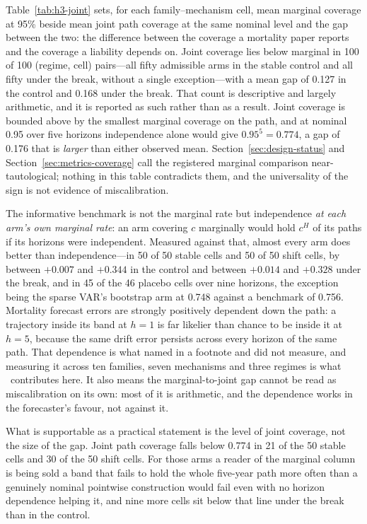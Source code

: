 Table~\ref{tab:h3-joint} sets, for each family--mechanism cell, mean
marginal coverage at 95\% beside mean joint path coverage at the same
nominal level and the gap between the two: the difference between the
coverage a mortality paper reports and the coverage a liability depends
on. Joint coverage lies below marginal in 100 of 100 (regime, cell)
pairs---all fifty admissible arms in the stable control and all fifty
under the break, without a single exception---with a mean gap of 0.127 in
the control and 0.168 under the break. That count is descriptive and
largely arithmetic, and it is reported as such rather than as a result.
Joint coverage is bounded above by the smallest marginal coverage on the
path, and at nominal 0.95 over five horizons independence alone would give
$0.95^5 = 0.774$, a gap of 0.176 that is \emph{larger} than either
observed mean. Section~\ref{sec:design-status} and
Section~\ref{sec:metrics-coverage} call the registered marginal comparison
near-tautological; nothing in this table contradicts them, and the
universality of the sign is not evidence of miscalibration.

The informative benchmark is not the marginal rate but independence
\emph{at each arm's own marginal rate}: an arm covering $c$ marginally
would hold $c^{H}$ of its paths if its horizons were independent. Measured
against that, almost every arm does better than independence---in 50 of 50
stable cells and 50 of 50 shift cells, by between $+0.007$ and $+0.344$ in
the control and between $+0.014$ and $+0.328$ under the break, and in 45 of
the 46 placebo cells over nine horizons, the exception being the sparse
VAR's bootstrap arm at 0.748 against a benchmark of 0.756. Mortality forecast
errors are strongly positively dependent down the path: a trajectory
inside its band at $h=1$ is far likelier than chance to be inside it at
$h=5$, because the same drift error persists across every horizon of the
same path. That dependence is what \citet{dowd2010backtesting} named in a
footnote and did not measure, and measuring it across ten families, seven
mechanisms and three regimes is what \Hthree\ contributes here. It also
means the marginal-to-joint gap cannot be read as miscalibration on its
own: most of it is arithmetic, and the dependence works in the
forecaster's favour, not against it.

What is supportable as a practical statement is the level of joint
coverage, not the size of the gap. Joint path coverage falls below 0.774
in 21 of the 50 stable cells and 30 of the 50 shift cells. For those arms
a reader of the marginal column is being sold a band that fails to hold
the whole five-year path more often than a genuinely nominal pointwise
construction would fail even with no horizon dependence helping it, and
nine more cells sit below that line under the break than in the control.


